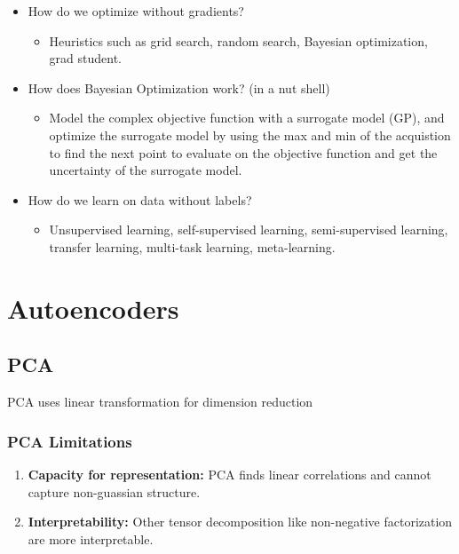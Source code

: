 \begin{summary}
    \begin{itemize}
        \item How do we optimize without gradients?
        \begin{itemize}
            \item Heuristics such as grid search, random search, Bayesian optimization, grad student.
        \end{itemize}
        \item How does Bayesian Optimization work? (in a nut shell)
        \begin{itemize}
            \item Model the complex objective function with a surrogate model (GP), and optimize the surrogate model by using the max and min of the acquistion to find the next point to evaluate on the objective function and get the uncertainty of the surrogate model.
        \end{itemize}
        \item How do we learn on data without labels?
        \begin{itemize}
            \item Unsupervised learning, self-supervised learning, semi-supervised learning, transfer learning, multi-task learning, meta-learning.
        \end{itemize}
    \end{itemize}
\end{summary}

\section{Autoencoders}
\subsection{PCA}
\begin{definition}
    PCA uses linear transformation for dimension reduction
\end{definition}

\subsubsection{PCA Limitations}
\begin{definition}
    \begin{enumerate}
        \item \textbf{Capacity for representation:} PCA finds linear correlations and cannot capture non-guassian structure.
        \item \textbf{Interpretability:} Other tensor decomposition like non-negative factorization are more interpretable.
    \end{enumerate}
\end{definition}

